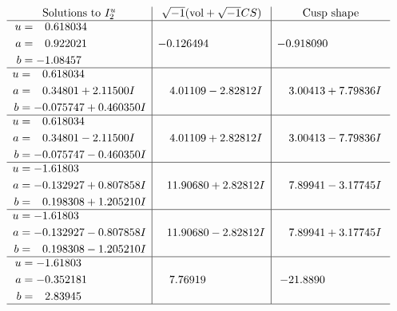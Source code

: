 \documentclass[1p]{elsarticle_modified}
\theoremstyle{definition}
\newcommand{\I}{\sqrt{-1}}
\begin{document}
$$\begin{array}{c|c|c}  
\text{Solutions to }I^u_{2}& \I (\text{vol} + \sqrt{-1}CS) & \text{Cusp shape}\\
 \hline 
\begin{aligned}
u &= \phantom{-}0.618034\phantom{ +0.000000I} \\
a &= \phantom{-}0.922021\phantom{ +0.000000I} \\
b &= -1.08457\phantom{ +0.000000I}\end{aligned}
 & -0.126494\phantom{ +0.000000I} & -0.918090\phantom{ +0.000000I} \\ \hline\begin{aligned}
u &= \phantom{-}0.618034\phantom{ +0.000000I} \\
a &= \phantom{-}0.34801 + 2.11500 I \\
b &= -0.075747 + 0.460350 I\end{aligned}
 & \phantom{-}4.01109 - 2.82812 I & \phantom{-}3.00413 + 7.79836 I \\ \hline\begin{aligned}
u &= \phantom{-}0.618034\phantom{ +0.000000I} \\
a &= \phantom{-}0.34801 - 2.11500 I \\
b &= -0.075747 - 0.460350 I\end{aligned}
 & \phantom{-}4.01109 + 2.82812 I & \phantom{-}3.00413 - 7.79836 I \\ \hline\begin{aligned}
u &= -1.61803\phantom{ +0.000000I} \\
a &= -0.132927 + 0.807858 I \\
b &= \phantom{-}0.198308 + 1.205210 I\end{aligned}
 & \phantom{-}11.90680 + 2.82812 I & \phantom{-}7.89941 - 3.17745 I \\ \hline\begin{aligned}
u &= -1.61803\phantom{ +0.000000I} \\
a &= -0.132927 - 0.807858 I \\
b &= \phantom{-}0.198308 - 1.205210 I\end{aligned}
 & \phantom{-}11.90680 - 2.82812 I & \phantom{-}7.89941 + 3.17745 I \\ \hline\begin{aligned}
u &= -1.61803\phantom{ +0.000000I} \\
a &= -0.352181\phantom{ +0.000000I} \\
b &= \phantom{-}2.83945\phantom{ +0.000000I}\end{aligned}
 & \phantom{-}7.76919\phantom{ +0.000000I} & -21.8890\phantom{ +0.000000I}\\
 \hline 
 \end{array}$$\newpage\newpage\renewcommand{\arraystretch}{1}
\end{document}
